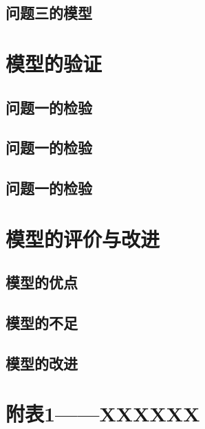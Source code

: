 \documentclass[]{article}   %
\begin{document}
	\subsection{问题三的模型}
	\newpage
	\section{模型的验证}
	\subsection{问题一的检验}
	\subsection{问题一的检验}
	\subsection{问题一的检验}
	\newpage
	\section{模型的评价与改进}
	\subsection{模型的优点}
	\subsection{模型的不足}
	\subsection{模型的改进}
	
	\appendix 
	\renewcommand{\appendixname}{Appendix~\Alph{section}}
	\section{附表1——XXXXXX}
	
	\newpage	
	\begin{thebibliography}{9}%
	\end{thebibliography}
	
\end{document}
